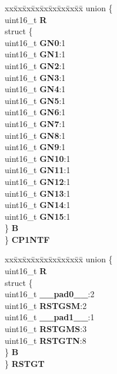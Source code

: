 \begin{DoxyCompactItemize}
\begin{tabbing}
\end{tabbing}\item 
\mbox{\label{structSEMA4__tag_ae1f49b575fea3ba5163ff68c3511f5be}} 
\begin{tabbing}
xx\=xx\=xx\=xx\=xx\=xx\=xx\=xx\=xx\=\kill
union \{\\
\>uint16\_t {\bfseries R}\\
\>struct \{\\
\>\>uint16\_t {\bfseries GN0}:1\\
\>\>uint16\_t {\bfseries GN1}:1\\
\>\>uint16\_t {\bfseries GN2}:1\\
\>\>uint16\_t {\bfseries GN3}:1\\
\>\>uint16\_t {\bfseries GN4}:1\\
\>\>uint16\_t {\bfseries GN5}:1\\
\>\>uint16\_t {\bfseries GN6}:1\\
\>\>uint16\_t {\bfseries GN7}:1\\
\>\>uint16\_t {\bfseries GN8}:1\\
\>\>uint16\_t {\bfseries GN9}:1\\
\>\>uint16\_t {\bfseries GN10}:1\\
\>\>uint16\_t {\bfseries GN11}:1\\
\>\>uint16\_t {\bfseries GN12}:1\\
\>\>uint16\_t {\bfseries GN13}:1\\
\>\>uint16\_t {\bfseries GN14}:1\\
\>\>uint16\_t {\bfseries GN15}:1\\
\>\} {\bfseries B}\\
\} {\bfseries CP1NTF}\\

\end{tabbing}\item 
\mbox{\label{structSEMA4__tag_a98d021dd22bdc9a1a43859f78e504775}} 
\begin{tabbing}
xx\=xx\=xx\=xx\=xx\=xx\=xx\=xx\=xx\=\kill
union \{\\
\>uint16\_t {\bfseries R}\\
\>struct \{\\
\>\>uint16\_t {\bfseries \_\_pad0\_\_}:2\\
\>\>uint16\_t {\bfseries RSTGSM}:2\\
\>\>uint16\_t {\bfseries \_\_pad1\_\_}:1\\
\>\>uint16\_t {\bfseries RSTGMS}:3\\
\>\>uint16\_t {\bfseries RSTGTN}:8\\
\>\} {\bfseries B}\\
\} {\bfseries RSTGT}\\


\end{tabbing}
\end{DoxyCompactItemize}
